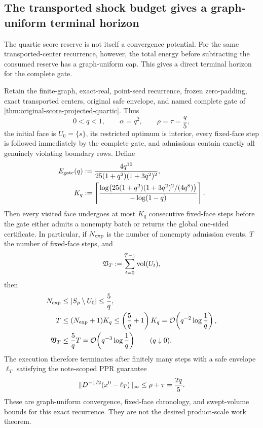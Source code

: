 \subsection{The transported shock budget gives a graph-uniform terminal horizon}
\label{sec:complete-gate-horizon}

The quartic score reserve is not itself a convergence potential.  For the
same transported-center recurrence, however, the total energy before
subtracting the consumed reserve has a graph-uniform cap.  This gives a
direct terminal horizon for the complete gate.

\begin{theorem}
\label{thm:complete-gate-soft-horizon}
Retain the finite-graph, exact-real, point-seed recurrence, frozen
zero-padding, exact transported centers, original safe envelope, and named
complete gate of \cref{thm:original-score-projected-quartic}.  Thus
\begin{equation*}
 0<q<1,
 \qquad \alpha=q^2,
 \qquad \rho=\tau=\frac q5,
\end{equation*}
the initial face is $U_0=\{s\}$, its restricted optimum is interior, every
fixed-face step is followed immediately by the complete gate, and admissions
contain exactly all genuinely violating boundary rows.  Define
\begin{align}
 E_{\rm gate}(q)
 &:=\frac{4q^{10}}{25(1+q^2)(1+3q^2)^2},
 \label{eq:complete-gate-energy-threshold}\\
 K_q
 &:=\left\lceil
 \frac{\log\!\left(
       25(1+q^2)(1+3q^2)^2/(4q^8)\right)}
      {-\log(1-q)}
 \right\rceil.
 \label{eq:complete-gate-hold-bound}
\end{align}
Then every visited face undergoes at most $K_q$ consecutive fixed-face steps
before the gate either admits a nonempty batch or returns the global
one-sided certificate.  In particular, if $N_{\rm exp}$ is the number of
nonempty admission events, $T$ the number of fixed-face steps, and
\begin{equation*}
 \mathfrak V_T:=\sum_{t=0}^{T-1}\operatorname{vol}(U_t),
\end{equation*}
then
\begin{align}
 N_{\rm exp}
 &\leq \left\lvert S_\rho\setminus U_0 \right\rvert\leq\frac5q,
 \label{eq:complete-gate-admission-count}\\
 T
 &\leq(N_{\rm exp}+1)K_q
 \leq\left(\frac5q+1\right)K_q
 =\mathcal{O}\!\left(q^{-2}\log\frac1q\right),
 \label{eq:complete-gate-total-steps}\\
 \mathfrak V_T
 &\leq\frac5qT
 =\mathcal{O}\!\left(q^{-3}\log\frac1q\right)
 \qquad(q\downarrow0).
 \label{eq:complete-gate-swept-volume}
\end{align}
The execution therefore terminates after finitely many steps with a safe
envelope $\ell_T$ satisfying the note-scoped PPR guarantee
\begin{equation}
 \lVert D^{-1/2}(x^0-\ell_T)\rVert_\infty\leq\rho+\tau=\frac{2q}{5}.
 \label{eq:complete-gate-terminal-error}
\end{equation}
These are graph-uniform convergence, fixed-face chronology, and swept-volume
bounds for this exact recurrence.  They are not the desired product-scale
work theorem.
\end{theorem}

